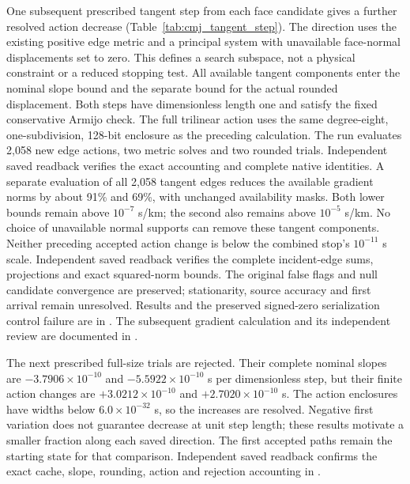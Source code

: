 One subsequent prescribed tangent step from each face candidate gives a
further resolved action decrease (Table~\ref{tab:cmj_tangent_step}). The
direction uses the existing positive edge metric and a principal system
with unavailable face-normal displacements set to zero. This defines a
search subspace, not a physical constraint or a reduced stopping test.
All available tangent components enter the nominal slope bound and the
separate bound for the actual rounded displacement. Both steps have
dimensionless length one and satisfy the fixed conservative Armijo check.
The full trilinear action uses the same degree-eight, one-subdivision,
128-bit enclosure as the preceding calculation. The run evaluates 2,058
new edge actions, two metric solves and two rounded trials. Independent
saved readback verifies the exact accounting and complete native identities.
A separate evaluation of all 2,058 tangent edges reduces the available
gradient norms by about 91\% and 69\%, with unchanged availability masks.
Both lower bounds remain above $10^{-7}$ s/km; the second also remains
above $10^{-5}$ s/km. No choice of unavailable normal supports can remove
these tangent components. Neither preceding accepted action change is below
the combined stop's $10^{-11}$ s scale. Independent saved readback verifies
the complete incident-edge sums, projections and exact squared-norm bounds.
The original false flags and null candidate convergence are preserved;
stationarity, source accuracy and first arrival remain unresolved.
Results and the preserved signed-zero serialization control failure are in
.
The subsequent gradient calculation and its independent review are documented
in .

The next prescribed full-size trials are rejected. Their complete nominal
slopes are $-3.7906\times10^{-10}$ and $-5.5922\times10^{-10}$ s per
dimensionless step, but their finite action changes are
$+3.0212\times10^{-10}$ and $+2.7020\times10^{-10}$ s. The action enclosures
have widths below $6.0\times10^{-32}$ s, so the increases are resolved.
Negative first variation does not guarantee decrease at unit step length;
these results motivate a smaller fraction along each saved direction.
The first accepted paths remain the starting state for that comparison. Independent saved
readback confirms the exact cache, slope, rounding, action and rejection
accounting in
.

